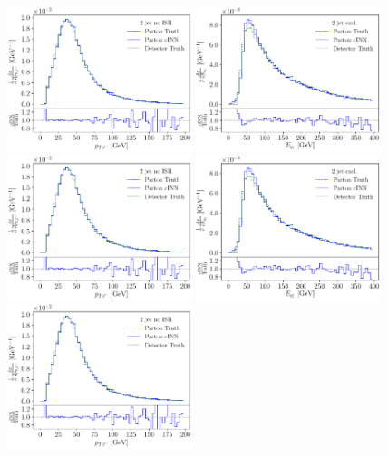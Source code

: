 \begin{figure}[t]
\includegraphics[page = 2, width=0.48\textwidth]{figures/cINN/cINN_full_ratio}
\includegraphics[page = 9, width=0.48\textwidth]{figures/cINN/isr_2jonly_test} \\
\includegraphics[page =3, width=0.48\textwidth]{figures/cINN/cINN_full_ratio}
\includegraphics[page =10, width=0.48\textwidth]{figures/cINN/isr_2jonly_test} \\
\includegraphics[page =4, width=0.48\textwidth]{figures/cINN/cINN_full_ratio}

\end{figure}
